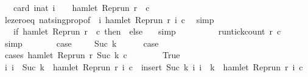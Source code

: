 \begin{isabellebody}
\ {\isacartoucheopen}{\isachardot}{\isachardot}{\isachardot}\ {\isacharequal}\ card\ {\isacharbraceleft}i{\isacharcolon}{\isacharcolon}nat{\isachardot}\ i\ {\isacharequal}\ {}\ {\isasymand}\ hamlet\ {\isacharparenleft}{\isacharparenleft}Rep{\isacharunderscore}run\ r{\isacharparenright}\ {}\ c{\isacharparenright}{\isacharbraceright}{\isacartoucheclose}\isanewline
\ \ \ \ \ \ \isamarkupfalse%
\ le{\isacharunderscore}zero{\isacharunderscore}eq\ nat{\isacharunderscore}sing{\isacharunderscore}prop{\isacharbrackleft}of\ {\isacartoucheopen}{}{\isacartoucheclose}\ {\isacartoucheopen}{\isasymlambda}i{\isachardot}\ hamlet\ {\isacharparenleft}{\isacharparenleft}Rep{\isacharunderscore}run\ r{\isacharparenright}\ i\ c{\isacharparenright}{\isacartoucheclose}{\isacharbrackright}\ \isamarkupfalse%
\ simp\isanewline
\ \ \ \ \isamarkupfalse%
\ \isamarkupfalse%
\ {\isacartoucheopen}{\isachardot}{\isachardot}{\isachardot}\ {\isacharequal}\ {\isacharparenleft}if\ hamlet\ {\isacharparenleft}{\isacharparenleft}Rep{\isacharunderscore}run\ r{\isacharparenright}\ {}\ c{\isacharparenright}\ then\ {}\ else\ {}{\isacharparenright}{\isacartoucheclose}\ \isamarkupfalse%
\ simp\isanewline
\ \ \ \ \isamarkupfalse%
\ \isamarkupfalse%
\ {\isacartoucheopen}{\isachardot}{\isachardot}{\isachardot}\ {\isacharequal}\ run{\isacharunderscore}tick{\isacharunderscore}count\ r\ c\ {}{\isacartoucheclose}\ \isamarkupfalse%
\ simp\isanewline
\ \ \ \ \isamarkupfalse%
\ \isamarkupfalse%
\ {\isacharquery}case\ \isacommand{{\isachardot}}\isamarkupfalse%
\isanewline
{}\isamarkupfalse%
\isanewline
\ \ \isamarkupfalse%
\ {\isacharparenleft}Suc\ k{\isacharparenright}\isanewline
\ \ \ \ \isamarkupfalse%
\ {\isacharquery}case\isanewline
\ \ \ \ \isamarkupfalse%
\ {\isacharparenleft}cases\ {\isacartoucheopen}hamlet\ {\isacharparenleft}{\isacharparenleft}Rep{\isacharunderscore}run\ r{\isacharparenright}\ {\isacharparenleft}Suc\ k{\isacharparenright}\ c{\isacharparenright}{\isacartoucheclose}{\isacharparenright}\isanewline
\ \ \ \ \ \ \isamarkupfalse%
\ True\isanewline
\ \ \ \ \ \ \ \ \isamarkupfalse%
\ {\isacartoucheopen}{\isacharbraceleft}i{\isachardot}\ i\ {\isasymle}\ Suc\ k\ {\isasymand}\ hamlet\ {\isacharparenleft}{\isacharparenleft}Rep{\isacharunderscore}run\ r{\isacharparenright}\ i\ c{\isacharparenright}{\isacharbraceright}\ {\isacharequal}\ insert\ {\isacharparenleft}Suc\ k{\isacharparenright}\ {\isacharbraceleft}i{\isachardot}\ i\ {\isasymle}\ k\ {\isasymand}\ hamlet\ {\isacharparenleft}{\isacharparenleft}Rep{\isacharunderscore}run\ r{\isacharparenright}\ i\ c{\isacharparenright}{\isacharbraceright}{\isacartoucheclose}\isanewline

\end{isabellebody}
